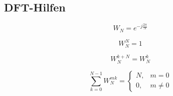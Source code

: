 \subsection{DFT-Hilfen}

\[
W_N
=
e^{-j\frac{2\pi}{N}}
\]

\[
W_N^N=1
\]

\[
W_N^{k+N}=W_N^k
\]

\[
\sum_{k=0}^{N-1}W_N^{mk}
=
\begin{cases}
N,&m=0\\
0,&m\neq0
\end{cases}
\]